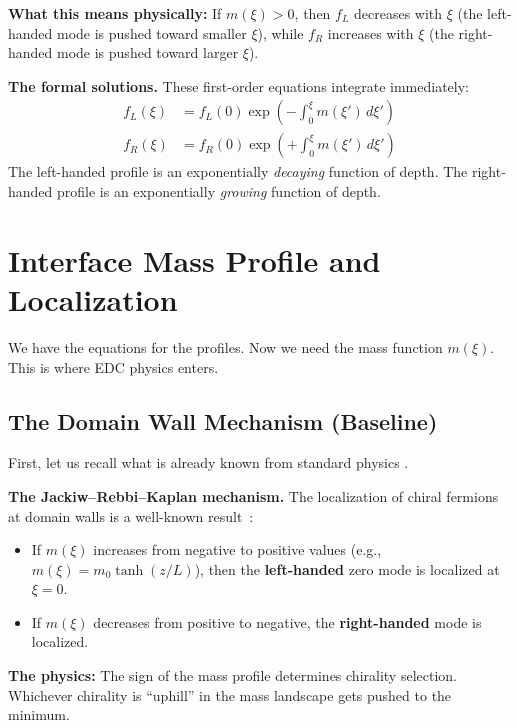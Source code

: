 \textbf{What this means physically:} If $m(\xi) > 0$, then $f_L$ decreases with $\xi$
(the left-handed mode is pushed toward smaller $\xi$), while $f_R$ increases with $\xi$
(the right-handed mode is pushed toward larger $\xi$).

\textbf{The formal solutions.} These first-order equations integrate immediately:
\begin{align}
    f_L(\xi) &= f_L(0) \exp\left(-\int_0^\xi m(\xi') \, d\xi'\right) \label{eq:ch9_fL_sol} \\
    f_R(\xi) &= f_R(0) \exp\left(+\int_0^\xi m(\xi') \, d\xi'\right) \label{eq:ch9_fR_sol}
\end{align}
The left-handed profile is an exponentially \emph{decaying} function of depth.
The right-handed profile is an exponentially \emph{growing} function of depth.

\section{Interface Mass Profile and Localization}
\label{sec:ch9_localization}

We have the equations for the profiles. Now we need the mass function $m(\xi)$.
This is where EDC physics enters.

\subsection{The Domain Wall Mechanism (Baseline)}

First, let us recall what is already known from standard physics \tagBL{}.

\textbf{The Jackiw--Rebbi--Kaplan mechanism.} The localization of chiral fermions
at domain walls is a well-known result~\cite{JackiwRebbi1976,Kaplan1992}:
\begin{itemize}[nosep]
    \item If $m(\xi)$ increases from negative to positive values (e.g., $m(\xi) = m_0 \tanh(z/L)$),
          then the \textbf{left-handed} zero mode is localized at $\xi = 0$.
    \item If $m(\xi)$ decreases from positive to negative, the \textbf{right-handed}
          mode is localized.
\end{itemize}

\textbf{The physics:} The sign of the mass profile determines chirality selection.
Whichever chirality is ``uphill'' in the mass landscape gets pushed to the minimum.

